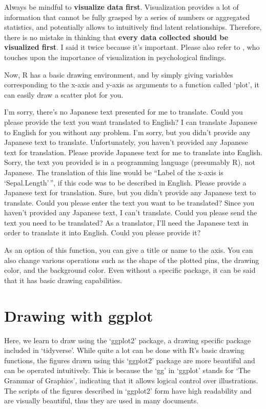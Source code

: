 \documentclass[
  a4paper,
]{book}
\begin{document}
Always be mindful to \textbf{visualize data first}. Visualization
provides a lot of information that cannot be fully grasped by a series
of numbers or aggregated statistics, and potentially allows to
intuitively find latent relationships. Therefore, there is no mistake in
thinking that \textbf{every data collected should be visualized first}.
I said it twice because it's important. Please also refer to
\textcite{Kieran2018}, who touches upon the importance of visualization
in psychological findings.

Now, R has a basic drawing environment, and by simply giving variables
corresponding to the x-axis and y-axis as arguments to a function called
`plot', it can easily draw a scatter plot for you.

I'm sorry, there's no Japanese text presented for me to translate. Could
you please provide the text you want translated to English? I can
translate Japanese to English for you without any problem. I'm sorry,
but you didn't provide any Japanese text to translate. Unfortunately,
you haven't provided any Japanese text for translation. Please provide
Japanese text for me to translate into English. Sorry, the text you
provided is in a programming language (presumably R), not Japanese. The
translation of this line would be ``Label of the x-axis is
`Sepal.Length'\,'', if this code was to be described in English. Please
provide a Japanese text for translation. Sure, but you didn't provide
any Japanese text to translate. Could you please enter the text you want
to be translated? Since you haven't provided any Japanese text, I can't
translate. Could you please send the text you need to be translated? As
a translator, I'll need the Japanese text in order to translate it into
English. Could you please provide it?

As an option of this function, you can give a title or name to the axis.
You can also change various operations such as the shape of the plotted
pins, the drawing color, and the background color. Even without a
specific package, it can be said that it has basic drawing capabilities.

\section{Drawing with ggplot}\label{drawing-with-ggplot}

Here, we learn to draw using the `ggplot2' package, a drawing specific
package included in `tidyverse'. While quite a lot can be done with R's
basic drawing functions, the figures drawn using this `ggplot2' package
are more beautiful and can be operated intuitively. This is because the
`gg' in `ggplot' stands for `The Grammar of Graphics', indicating that
it allows logical control over illustrations. The scripts of the figures
described in `ggplot2' form have high readability and are visually
beautiful, thus they are used in many documents.
\end{document}
